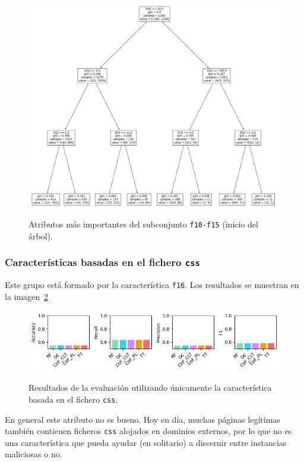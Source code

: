 \begin{figure}[h]
	\caption[\textit{Phishing}: detección (\texttt{f10-f15}, atributos relevantes, DT)]{Atributos más importantes del subconjunto \texttt{f10-f15} (inicio del árbol).}
	\centering
	\includegraphics[width=\textwidth]{../img/memoria/5_phishing/f10f15_tree}
	\label{gr:ph-f10f15_tree}
\end{figure}


\subsubsection{Características basadas en el fichero \texttt{css}}
Este grupo está formado por la característica \texttt{f16}. Los resultados se muestran en la imagen~\ref{gr:ph-f16_small}

\begin{figure}[h]
	\caption[\textit{Phishing}: detección (\texttt{f16})]{Resultados de la evaluación utilizando únicamente la característica basada en el fichero \texttt{css}.}
	\centering
	\includegraphics[width=\textwidth]{../img/memoria/5_phishing/f16_small}
	\label{gr:ph-f16_small}
\end{figure}

En general este atributo no es bueno. Hoy en día, muchas páginas legítimas también contienen ficheros \texttt{css} alojados en dominios externos, por lo que no es una característica que pueda ayudar (en solitario) a discernir entre instancias maliciosas o no.

